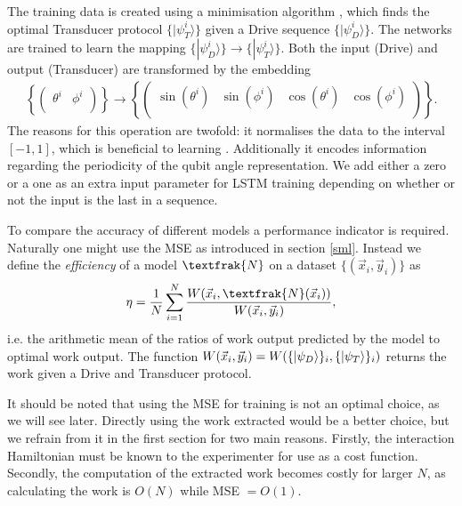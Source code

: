 The training data is created using a minimisation algorithm \cite{2020SciPy-NMeth}, which finds the optimal Transducer protocol $\{|\psi_T^i \rangle\}$ given a Drive sequence $\{|\psi_D^i \rangle\}$.
The networks are trained to learn the mapping $\{|\psi_D^i \rangle\} \to \{|\psi_T^i \rangle\}$.
Both the input (Drive) and output (Transducer) are transformed by the embedding
\begin{align*}
	\left\{
	\begin{pmatrix}
	\theta^i & \phi^i \\
	\end{pmatrix}
	\right\}
	\to
	\left\{
	\begin{pmatrix}
	\sin(\theta^i) & \sin(\phi^i) & \cos(\theta^i)  & \cos(\phi^i) \\
	\end{pmatrix}
	\right\}.
\end{align*}
The reasons for this operation are twofold: it normalises the data to the interval $[-1, 1]$, which is beneficial to learning \cite{LeCun2012}. Additionally it encodes information regarding the periodicity of the qubit angle representation.
We add either a zero or a one as an extra input parameter for LSTM training depending on whether or not the input is the last in a sequence.


To compare the accuracy of different models a performance indicator is required. 
Naturally one might use the MSE as introduced in section \ref{sml}.
Instead we define the \textit{efficiency} of a model $\textfrak{N}$ on a dataset $\{(\vec{x}_i, \vec{y}_i)\}$ as
\begin{align}
	\eta = \frac{1}{N} \sum_{i=1}^N \frac{W(\vec{x}_i,\textfrak{N}(\vec{x}_i))}{W(\vec{x}_i,\vec{y}_i)},
\end{align}
i.e. the arithmetic mean of the ratios of work output predicted by the model to optimal work output.
The function $W(\vec{x}_i, \vec{y}_i) = W(\{\ket{\psi_D}\}_i, \{\ket{\psi_T}\}_i)$ returns the work given a Drive and Transducer protocol.

It should be noted that using the MSE for training is not an optimal choice, as we will see later.
Directly using the work extracted would be a better choice, but we refrain from it in the first section for two main reasons.
Firstly, the interaction Hamiltonian must be known to the experimenter for use as a cost function.
Secondly, the computation of the extracted work becomes costly for larger $N$, as calculating the work is $O(N)$ while MSE $= O(1)$.